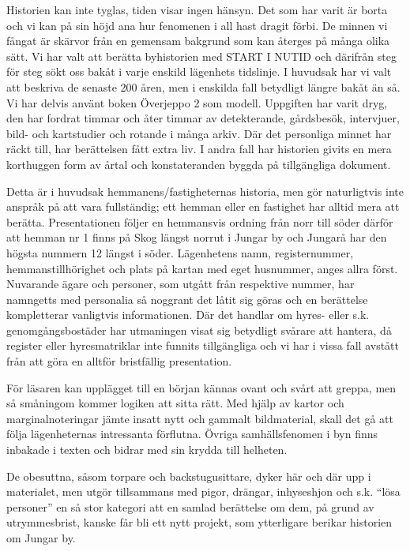 
%

Historien kan inte tyglas, tiden visar ingen hänsyn. Det som har varit är borta och vi kan på sin höjd ana hur fenomenen i all hast dragit förbi. De minnen vi fångat är skärvor från en gemensam bakgrund som kan återges på många olika sätt. Vi har valt att berätta byhistorien med START I NUTID och därifrån steg för steg sökt oss bakåt i varje enskild lägenhets tidslinje. I huvudsak har vi valt att beskriva de senaste 200 åren, men i enskilda fall betydligt längre bakåt än så. Vi har delvis använt boken Överjeppo 2 som modell. Uppgiften har varit dryg, den har fordrat timmar och åter timmar av detekterande, gårdsbesök, intervjuer, bild- och kartstudier och rotande i många arkiv. Där det personliga minnet har räckt till, har berättelsen fått extra liv. I andra fall har historien givits en mera korthuggen form av årtal och konstateranden byggda på tillgängliga dokument.

Detta är i huvudsak hemmanens/fastigheternas historia, men gör naturligtvis inte anspråk på att vara fullständig; ett hemman eller en fastighet har alltid mera att berätta. Presentationen följer en hemmansvis ordning från norr till söder därför  att hemman nr 1 finns på Skog längst norrut i Jungar by och Jungarå har den högsta nummern 12 längst i söder. Lägenhetens namn, registernummer, hemmanstillhörighet och plats på kartan med eget husnummer, anges allra först. Nuvarande ägare och personer, som utgått från respektive nummer, har namngetts med personalia så noggrant det låtit sig göras och en berättelse kompletterar vanligtvis informationen. Där det handlar om hyres- eller s.k. genomgångsbostäder har utmaningen visat sig betydligt svårare att hantera, då register eller hyresmatriklar inte funnits tillgängliga och vi har i vissa fall avstått från att göra en alltför bristfällig presentation.

För läsaren kan upplägget till en början kännas ovant och svårt att greppa, men så småningom kommer logiken att sitta rätt. Med hjälp av kartor och marginalnoteringar jämte insatt nytt och gammalt bildmaterial, skall det gå att följa lägenheternas intressanta förflutna. Övriga samhällsfenomen i byn finns inbakade i texten och bidrar med sin krydda till helheten.

De obesuttna, såsom torpare och backstugusittare, dyker här och där upp i materialet, men utgör tillsammans med pigor, drängar, inhyseshjon och s.k. ``lösa personer'' en så stor kategori att en samlad berättelse om dem, på grund av utrymmesbrist, kanske får bli ett nytt projekt, som ytterligare berikar historien om Jungar by.

